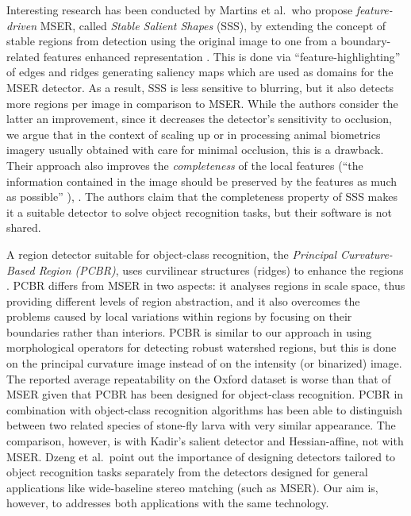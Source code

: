\documentclass[conference,compsoc]{IEEEtran}
\begin{document}
Interesting research has been conducted by Martins et al.~who propose {\em feature-driven} MSER, called  {\em Stable Salient Shapes} (SSS), by extending the concept of stable regions from detection using the original image to one from a boundary-related features enhanced representation \cite{MartinsVisapp12, Martins12}. This is done via ``feature-highlighting'' of edges and ridges generating saliency maps which are used as domains for the MSER detector. As a result, SSS is less sensitive to blurring, but it also detects more regions per image in comparison to MSER. While the authors consider the latter an improvement, since it decreases the detector's sensitivity to occlusion, we argue that in the context of scaling up or in processing animal biometrics imagery usually obtained with care for minimal occlusion, this is a drawback. Their approach also improves the {\em completeness} of the local features (``the information contained in the image should be preserved by the features as much as possible'' \cite{Dickscheid2011}), \cite{Martins2016OnTC}. The authors claim that the completeness property of SSS makes it a suitable detector to solve object recognition tasks, but their software is not shared.

A region detector suitable for object-class recognition, the {\em Principal Curvature-Based Region (PCBR)}, uses curvilinear structures (ridges) to enhance the regions \cite{DengZMDS07}. PCBR differs from MSER in two aspects: it analyses regions in scale space, thus providing different levels of region abstraction, and it also overcomes the problems caused by local variations within regions by focusing on their boundaries rather than interiors. PCBR is similar to our approach in using morphological operators for detecting robust watershed regions, but this is done on the principal curvature image instead of on the intensity (or binarized) image. The reported average repeatability on the Oxford dataset is worse than that of MSER given that PCBR has been designed for object-class recognition. PCBR in combination with object-class recognition algorithms has been able to distinguish between two related species of stone-fly larva with very similar appearance. The comparison, however, is with Kadir's salient detector \cite{Kadir2004} and Hessian-affine, not with MSER.  Dzeng et al.~point out the importance of designing detectors tailored to object recognition tasks separately from the detectors designed for general applications like wide-baseline stereo matching (such as MSER). Our aim is, however, to addresses both applications with the same technology.
\end{document}
